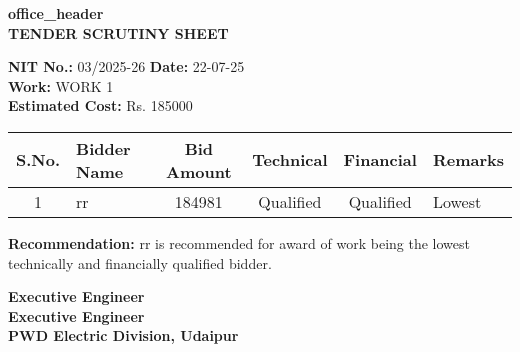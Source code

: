 \documentclass[12pt,a4paper]{article}
\begin{document}
\begin{center}
\textbf{{{office_header}}}\\[0.3cm]
\textbf{TENDER SCRUTINY SHEET}\\[0.2cm]
\end{center}

\vspace{0.5cm}

\noindent
\textbf{NIT No.:} 03/2025-26 \hfill \textbf{Date:} 22-07-25\\
\textbf{Work:} WORK 1\\
\textbf{Estimated Cost:} Rs. 185000

\vspace{0.5cm}

\begin{longtable}{|c|p{3cm}|c|c|c|p{2cm}|}
\hline
\textbf{S.No.} & \textbf{Bidder Name} & \textbf{Bid Amount} & \textbf{Technical} & \textbf{Financial} & \textbf{Remarks} \\
\hline

1 & rr & 184981 & Qualified & Qualified & Lowest \\
\hline

\end{longtable}

\vspace{0.5cm}

\noindent
\textbf{Recommendation:} rr is recommended for award of work being the lowest technically and financially qualified bidder.

\vspace{1cm}

\noindent
\textbf{Executive Engineer}\\
\textbf{Executive Engineer}\\
\textbf{PWD Electric Division, Udaipur}
\end{document}
